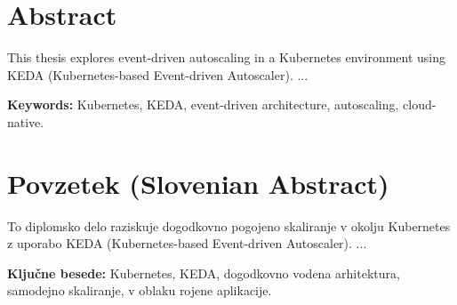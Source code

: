 \chapter*{Abstract}

This thesis explores event-driven autoscaling in a Kubernetes environment using KEDA (Kubernetes-based Event-driven Autoscaler).
...

\vspace{2cm}
\textbf{Keywords:} Kubernetes, KEDA, event-driven architecture, autoscaling, cloud-native.

\chapter*{Povzetek (Slovenian Abstract)}

To diplomsko delo raziskuje dogodkovno pogojeno skaliranje v okolju Kubernetes z uporabo KEDA (Kubernetes-based Event-driven Autoscaler).
...

\vspace{2cm}
\textbf{Ključne besede:} Kubernetes, KEDA, dogodkovno vodena arhitektura, samodejno skaliranje, v oblaku rojene aplikacije. 